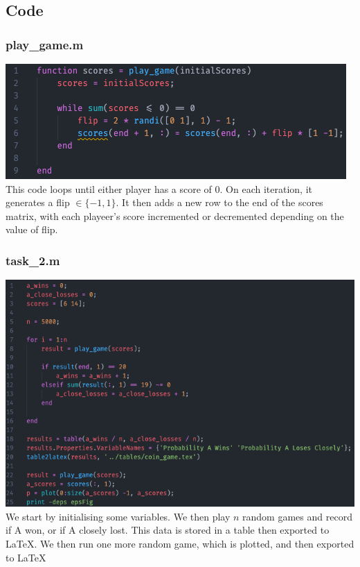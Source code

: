 \documentclass{article}
\begin{document}
\newpage

\subsection{Code}
\subsubsection{play\_game.m}
\includegraphics[width=\textwidth]{task_2/play_game.m.png}
This code loops until either player has a score of 0. On each iteration, it generates a flip $\in \{-1, 1\}$.
It then adds a new row to the end of the scores matrix, with each playeer's score incremented or decremented depending on the value of flip.

\subsubsection{task\_2.m}
\includegraphics[width=\textwidth]{task_2/task_2.m.png}
We start by initialising some variables.
We then play $n$ random games and record if A won, or if A closely lost.
This data is stored in a table then exported to \LaTeX.
We then run one more random game, which is plotted, and then exported to \LaTeX
\end{document}
